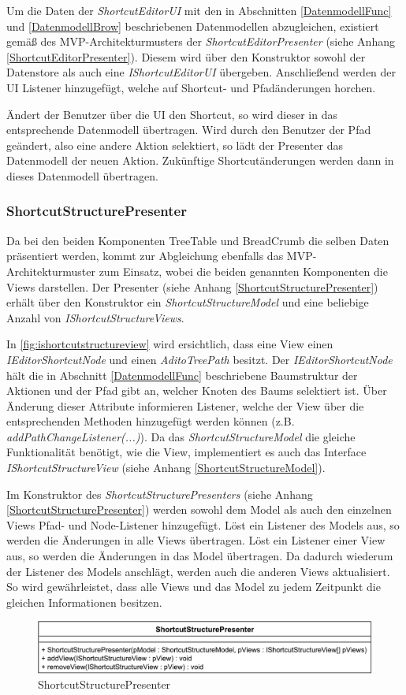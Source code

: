 Um die Daten der \emph{ShortcutEditorUI} mit den in Abschnitten \ref{DatenmodellFunc} und \ref{DatenmodellBrow} beschriebenen Datenmodellen abzugleichen, existiert gemäß des MVP-Architekturmusters der \emph{ShortcutEditorPresenter} (siehe Anhang \ref{ShortcutEditorPresenter}). Diesem wird über den Konstruktor sowohl der Datenstore als auch eine \emph{IShortcutEditorUI} übergeben. Anschließend werden der UI Listener hinzugefügt, welche auf Shortcut- und Pfadänderungen horchen.

Ändert der Benutzer über die UI den Shortcut, so wird dieser in das entsprechende Datenmodell übertragen. Wird durch den Benutzer der Pfad geändert, also eine andere Aktion selektiert, so lädt der Presenter das Datenmodell der neuen Aktion. Zukünftige Shortcutänderungen werden dann in dieses Datenmodell übertragen.

\subsubsection{ShortcutStructurePresenter}

Da bei den beiden Komponenten TreeTable und BreadCrumb die selben Daten präsentiert werden, kommt zur Abgleichung ebenfalls das MVP-Architekturmuster zum Einsatz, wobei die beiden genannten Komponenten die Views darstellen. Der Presenter (siehe Anhang \ref{ShortcutStructurePresenter}) erhält über den Konstruktor ein \emph{ShortcutStructureModel} und eine beliebige Anzahl von \emph{IShortcutStructureViews}. 

In \autoref{fig:ishortcutstructureview} wird ersichtlich, dass eine View einen \emph{IEditorShortcutNode} und einen \emph{AditoTreePath} besitzt. Der \emph{IEditorShortcutNode} hält die in Abschnitt \ref{DatenmodellFunc} beschriebene Baumstruktur der Aktionen und der Pfad gibt an, welcher Knoten des Baums selektiert ist. Über Änderung dieser Attribute informieren Listener, welche der View über die entsprechenden Methoden hinzugefügt werden können (z.B. \emph{addPathChangeListener(...)}). Da das \emph{ShortcutStructureModel} die gleiche Funktionalität benötigt, wie die View, implementiert es auch das Interface \emph{IShortcutStructureView} (siehe Anhang \ref{ShortcutStructureModel}).

Im Konstruktor des \emph{ShortcutStructurePresenters} (siehe Anhang \ref{ShortcutStructurePresenter}) werden sowohl dem Model als auch den einzelnen Views Pfad- und Node-Listener hinzugefügt. Löst ein Listener des Models aus, so werden die Änderungen in alle Views übertragen. Löst ein Listener einer View aus, so werden die Änderungen in das Model übertragen. Da dadurch wiederum der Listener des Models anschlägt, werden auch die anderen Views aktualisiert. So wird gewährleistet, dass alle Views und das Model zu jedem Zeitpunkt die gleichen Informationen besitzen.

\begin{figure}[H]
	\centering
	\includegraphics[width=0.6\linewidth]{../graphic/diagrams/CD_ShortcutStructurePresenter/ShortcutStructurePresenter}
	\caption{ShortcutStructurePresenter}
	\label{fig:shortcutstructurepresenter}
\end{figure}

\newpage
